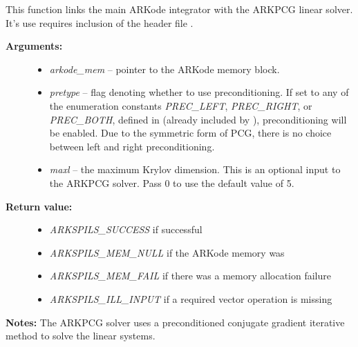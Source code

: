 \documentclass[letterpaper,10pt,english]{sphinxmanual}
\begin{document}

\begin{fulllineitems}
\label{c_interface/User_callable:ARKPcg}
This function links the main ARKode integrator with the ARKPCG
linear solver.  It's use requires inclusion of the header file
.
\begin{description}
\item[{\textbf{Arguments:}}] \leavevmode\begin{itemize}
\item {} 
\emph{arkode\_mem} -- pointer to the ARKode memory block.

\item {} 
\emph{pretype} -- flag denoting whether to use preconditioning.  If
set to any of the enumeration constants \emph{PREC\_LEFT}, \emph{PREC\_RIGHT},
or \emph{PREC\_BOTH}, defined in  (already
included by ), preconditioning will be
enabled. Due to the symmetric form of PCG, there is no choice
between left and right preconditioning.

\item {} 
\emph{maxl} -- the maximum Krylov dimension. This is an optional input
to the ARKPCG solver. Pass 0 to use the default value of 5.

\end{itemize}

\item[{\textbf{Return value:}}] \leavevmode\begin{itemize}
\item {} 
\emph{ARKSPILS\_SUCCESS} if successful

\item {} 
\emph{ARKSPILS\_MEM\_NULL}  if the ARKode memory was 

\item {} 
\emph{ARKSPILS\_MEM\_FAIL}  if there was a memory allocation failure

\item {} 
\emph{ARKSPILS\_ILL\_INPUT} if a required vector operation is missing

\end{itemize}

\end{description}

\textbf{Notes:} The ARKPCG solver uses a preconditioned conjugate
gradient iterative method to solve the linear systems.

\end{fulllineitems}
\end{document}
